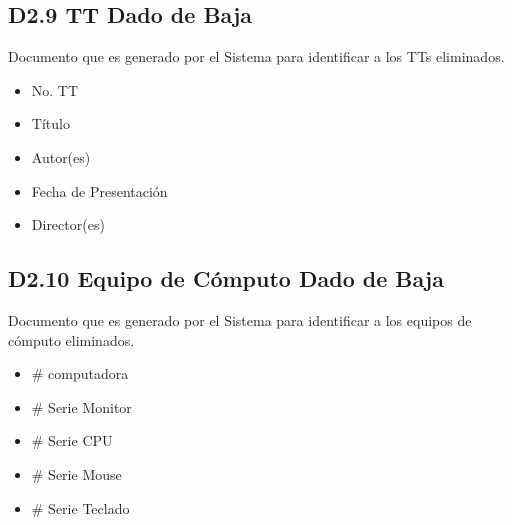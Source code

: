    \subsection{D2.9 TT Dado de Baja}

  Documento que es generado por el Sistema para identificar a los TTs eliminados.
  
  \begin{itemize}
  \item No. TT
  \item Título
  \item Autor(es)
  \item Fecha de Presentación
  \item Director(es)
  \end{itemize}

\subsection{D2.10 Equipo de Cómputo Dado de Baja}

  Documento que es generado por el Sistema para identificar a los equipos de cómputo eliminados.
  
  \begin{itemize}
  \item # computadora
  \item # Serie Monitor
  \item # Serie CPU
  \item # Serie Mouse
  \item # Serie Teclado
  \end{itemize}











